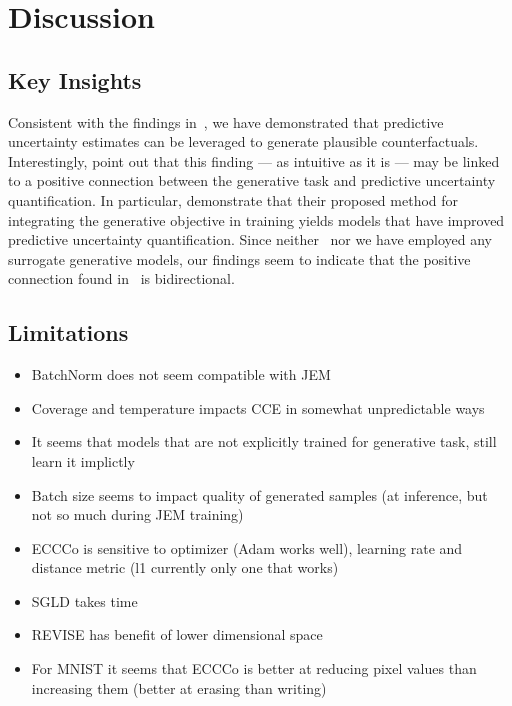 \documentclass{article}
\begin{document}
\section{Discussion}

\subsection{Key Insights}

Consistent with the findings in~\citet{schut2021generating}, we have demonstrated that predictive uncertainty estimates can be leveraged to generate plausible counterfactuals. Interestingly, \citet{schut2021generating} point out that this finding --- as intuitive as it is --- may be linked to a positive connection between the generative task and predictive uncertainty quantification. In particular, \citet{grathwohl2020your} demonstrate that their proposed method for integrating the generative objective in training yields models that have improved predictive uncertainty quantification. Since neither~\citet{schut2021generating} nor we have employed any surrogate generative models, our findings seem to indicate that the positive connection found in~\citet{grathwohl2020your} is bidirectional.

\subsection{Limitations}

\begin{itemize}
  \item BatchNorm does not seem compatible with JEM
  \item Coverage and temperature impacts CCE in somewhat unpredictable ways
  \item It seems that models that are not explicitly trained for generative task, still learn it implictly
  \item Batch size seems to impact quality of generated samples (at inference, but not so much during JEM training)
  \item ECCCo is sensitive to optimizer (Adam works well), learning rate and distance metric (l1 currently only one that works)
  \item SGLD takes time 
  \item REVISE has benefit of lower dimensional space
  \item For MNIST it seems that ECCCo is better at reducing pixel values than increasing them (better at erasing than writing)
\end{itemize}
\end{document}

